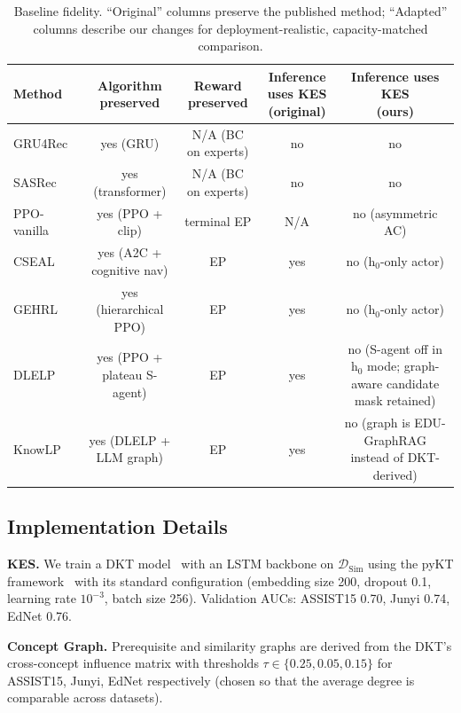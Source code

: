 \documentclass[sigconf,anonymous]{acmart}
\begin{document}
\begin{table}[t]
\centering
\caption{Baseline fidelity. ``Original'' columns preserve the published method; ``Adapted'' columns describe our changes for deployment-realistic, capacity-matched comparison.}
\label{tab:baseline_fidelity}
\small
\begin{tabular}{@{}l|cccc@{}}
\toprule
Method & Algorithm preserved & Reward preserved & \makecell{Inference uses KES\\(original)} & \makecell{Inference uses KES\\(ours)} \\
\midrule
GRU4Rec~\cite{hidasi2016gru4rec}    & yes (GRU)                 & N/A (BC on experts)       & no  & no \\
SASRec~\cite{kang2018sasrec}        & yes (transformer)         & N/A (BC on experts)       & no  & no \\
PPO-vanilla~\cite{schulman2017ppo}  & yes (PPO + clip)          & terminal EP               & N/A & no (asymmetric AC) \\
CSEAL~\cite{liu2019cseal}           & yes (A2C + cognitive nav) & EP                        & yes & no (h$_0$-only actor) \\
GEHRL~\cite{li2023gehrl}            & yes (hierarchical PPO)    & EP                        & yes & no (h$_0$-only actor) \\
DLELP~\cite{cheng2025knowlp}        & yes (PPO + plateau S-agent)& EP                        & yes & no (S-agent off in h$_0$ mode; graph-aware candidate mask retained) \\
KnowLP~\cite{cheng2025knowlp}       & yes (DLELP + LLM graph)   & EP                        & yes & no (graph is EDU-GraphRAG instead of DKT-derived) \\
\bottomrule
\end{tabular}
\end{table}

\subsection{Implementation Details}

\textbf{KES.} We train a DKT model~\cite{piech2015dkt} with an LSTM backbone on $\mathcal{D}_{\text{Sim}}$ using the pyKT framework~\cite{liu2022pykt} with its standard configuration (embedding size 200, dropout 0.1, learning rate $10^{-3}$, batch size 256). Validation AUCs: ASSIST15 0.70, Junyi 0.74, EdNet 0.76.

\textbf{Concept Graph.} Prerequisite and similarity graphs are derived from the DKT's cross-concept influence matrix with thresholds $\tau \in\{0.25, 0.05, 0.15\}$ for ASSIST15, Junyi, EdNet respectively (chosen so that the average degree is comparable across datasets).
\end{document}
